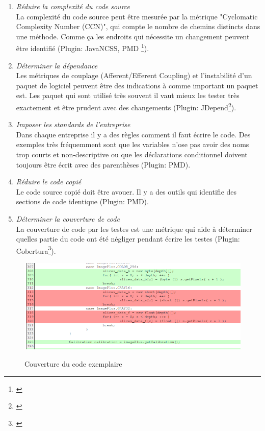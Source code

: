 \begin{enumerate}

\item \textit{Réduire la complexité du code source} \\ La complexité du code source peut être mesurée par la métrique "Cyclomatic Complexity Number (CCN)", qui compte le nombre de chemins distincts dans une méthode. Comme ça les endroits qui nécessite un changement peuvent être identifié (Plugin: JavaNCSS, PMD \footnote{\citep{pluginpmd}}).

\item \textit{Déterminer la dépendance} \\ Les métriques de couplage (Afferent/Efferent Coupling) et l'instabilité d'un paquet de logiciel peuvent être des indications à comme important un paquet est. Les paquet qui sont utilisé très souvent il vaut mieux les tester très exactement et être prudent avec des changements (Plugin: JDepend\footnote{\citep{pluginjdepend}}).

\item \textit{Imposer les standards de l'entreprise}\\ Dans chaque entreprise il y a des règles comment il faut écrire le code. Des exemples très fréquemment sont que les variables n'ose pas avoir des noms trop courts et non-descriptive ou que les déclarations conditionnel doivent toujours être écrit avec des parenthèses (Plugin: PMD).

\item \textit{Réduire le code copié} \\ Le code source copié doit être avouer. Il y a des outils qui identifie des sections de code identique (Plugin: PMD).

\item \textit{Déterminer la couverture de code} \\ La couverture de code par les testes est une métrique qui aide à déterminer quelles partie du code ont été négliger pendant écrire les testes (Plugin: Cobertura\footnote{\citep{plugincobertura}}).

\end{enumerate}

\begin{figure}[H]
\centering
\includegraphics[width=15cm]{bilder/Coverage}
\caption{Couverture du code exemplaire} \cite{codecoverage}
\label{fig:coverage}
\end{figure}


